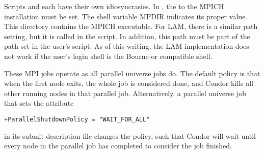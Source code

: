 Scripts  and 
each have their own idiosyncrasies.
In , the  to the MPICH installation must be set.
The shell variable MPDIR indicates its proper value.
This directory contains the MPICH  executable.
For LAM, there is a similar path setting, but it is called 
in the  script.  In addition, this path must be part of the
path set in the user's  script.
As of this writing, the LAM implementation does not work
if the user's login shell is the Bourne or compatible shell.

These MPI jobs operate as all parallel universe jobs do.
The default policy is that when the first node exits,
the whole job is considered done, 
and Condor kills all other running nodes in that parallel job.
Alternatively, a parallel universe job that sets the attribute
\begin{verbatim}
+ParallelShutdownPolicy = "WAIT_FOR_ALL"
\end{verbatim}
in its submit description file changes the policy,
such that Condor will wait until every node in the parallel 
job has completed to consider the job finished. 

